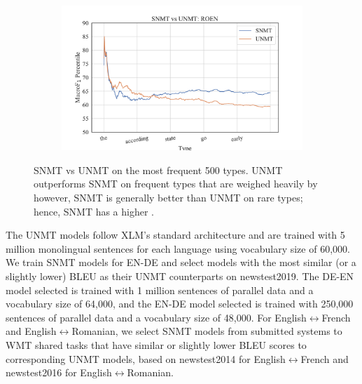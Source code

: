 \begin{figure}[ht]
    \begin{subfigure}[b]{0.9\linewidth}
    \includegraphics[width=\linewidth,trim={13mm 5mm 25mm 10mm},clip]{img/s_unmt-roen-maf1.pdf}
    \end{subfigure}
\caption{SNMT vs UNMT  on the most frequent 500 types.
UNMT outperforms SNMT on frequent types that are weighed heavily by \bleu\, however, SNMT is generally better than UNMT on rare types; hence, SNMT has a higher . 
}
\label{fig:snmt_vs_unmt}
\end{figure}




The UNMT models follow XLM's standard architecture and are trained with 5 million monolingual sentences for each language using vocabulary size of 60,000. 
We train SNMT models for EN-DE and select models with the most similar (or a slightly lower) BLEU as their UNMT counterparts on newstest2019. The DE-EN model selected is trained with 1 million sentences of parallel data and a vocabulary size of 64,000, and the EN-DE model selected is trained with 250,000 sentences of parallel data and a vocabulary size of 48,000. For English$\leftrightarrow$French and English$\leftrightarrow$Romanian, we select SNMT models from submitted systems to WMT shared tasks that have similar or slightly lower BLEU scores to corresponding UNMT models, based on newstest2014 for English$\leftrightarrow$French and newstest2016 for English$\leftrightarrow$Romanian. 

